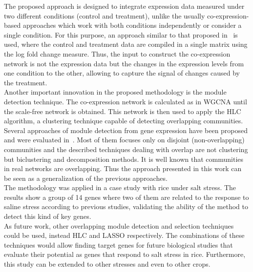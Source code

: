 \documentclass[12pt,journal, onecolumn]{IEEEtran}
\begin{document}
The proposed approach is designed to integrate expression data measured under two different conditions (control and treatment), unlike the usually co-expression-based approaches which work with both conditions independently or consider a single condition. For this purpose, an approach similar to that proposed in~\cite{du2019network} is used, where the control and treatment data are compiled in a single matrix using the log fold change measure. Thus, the input to construct the co-expression network is not the expression data but the changes in the expression levels from one condition to the other, allowing to capture the signal of changes caused by the treatment.\\

Another important innovation in the proposed methodology is the module detection technique. The co-expression network is calculated as in WGCNA until the scale-free network is obtained. This network is then used to apply the HLC algorithm, a clustering technique capable of detecting overlapping communities. Several approaches of module detection from gene expression have been proposed and were evaluated in~\cite{saelens2018comprehensive}. Most of them focuses only on disjoint (non-overlapping) communities and the described techniques dealing with overlap are not clustering but biclustering and decomposition methods. It is well known that communities in real networks are overlapping. Thus the approach presented in this work can be seen as a generalization of the previous approaches.\\



The methodology was applied in a case study with rice under salt stress. The results show a group of 14 genes where two of them are related to the response to saline stress according to previous studies, validating the ability of the method to detect this kind of key genes.\\

As future work, other overlapping module detection and selection techniques could be used, instead HLC and LASSO respectively. The combinations of these techniques would allow finding target genes for future biological studies that evaluate their potential as genes that respond to salt stress in rice. Furthermore, this study can be extended to other stresses and even to other crops.\\




\end{document}
